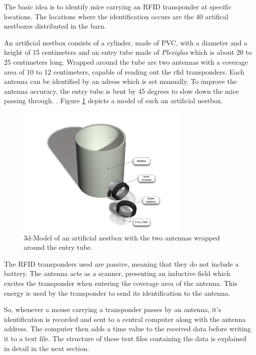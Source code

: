 The basic idea is to identify mice carrying an RFID transponder at specific locations. The locations where the identification occurs are the 40 artifical nestboxes distributed in the barn. 

An artificial nestbox consists of a cylinder, made of \ac{PVC}, with a diameter and a height of 15 centimeters and an entry tube made of \textit{Plexiglas} which is about 20 to 25 centimeters long. Wrapped around the tube are two antennas with a coverage area of 10 to 12 centimeters, capable of reading out the rfid transponders. Each antenna can be identified by an adress which is set manually. To improve the antenna accuracy, the entry tube is bent by 45 degrees to slow down the mice passing through. . Figure \ref{fig:artNestbox} depicts a model of such an artificial nestbox.
 
\begin{figure}[htbp]	
\centering	
\includegraphics[width=0.75\textwidth]{assets/pdf/box_schema.pdf}	
\caption[Model of an artificial nestbox]{3d-Model of an artificial nestbox with the two antennas wrapped around the entry tube.}
\label{fig:artNestbox}
\end{figure}

The RFID transponders used are passive, meaning that they do not include a battery. The antenna acts as a scanner, presenting an inductive field which excites the transponder when entering the coverage area of the antenna. This energy is used by the transponder to send its identification to the antenna. 

So, whenever a mouse carrying a transponder passes by an antenna, it's identification is recorded and sent to a central computer along with the antenna address. The computer then adds a time value to the received data before writing it to a text file. The structure of these text files containing the data is explained in detail in the next section.

